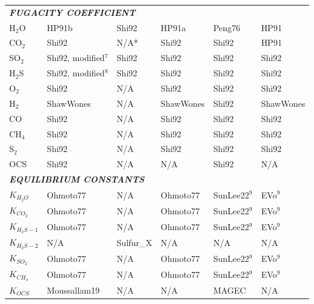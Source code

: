 \begin{landscape}
\begin{longtable}{p{1.4cm}p{3cm}p{3cm}p{3cm}p{3cm}p{3cm}}
\multicolumn{6}{p{17.8cm}}{\cellcolor[HTML]{D9D9D9}\textit{\textbf{FUGACITY COEFFICIENT}}} \\
H$_2$O &
  HP91b &
  Shi92 &
  HP91a &
  Peng76 &
  HP91 \\
CO$_2$ &
  Shi92 &
  N/A* &
  Shi92 &
  Shi92 &
  HP91 \\
SO$_2$ &
  Shi92, modified$^7$ &
  Shi92 &
  Shi92 &
  Shi92 &
  Shi92 \\
H$_2$S &
  Shi92, modified$^8$ &
  Shi92 &
  Shi92 &
  Shi92 &
  Shi92 \\
O$_2$ &
  Shi92 &
  N/A &
  Shi92 &
  Shi92 &
  Shi92 \\
H$_2$ &
  ShawWones &
  N/A &
  ShawWones &
  Shi92 &
  ShawWones \\
CO &
  Shi92 &
  N/A &
  Shi92 &
  Shi92 &
  Shi92 \\
CH$_4$ &
  Shi92 &
  N/A &
  Shi92 &
  Shi92 &
  Shi92 \\
S$_2$ &
  Shi92 &
  N/A &
  Shi92 &
  Shi92 &
  Shi92 \\
OCS &
  Shi92 &
  N/A &
  N/A &
  Shi92 &
  N/A \\

\multicolumn{6}{p{17.8cm}}{\cellcolor[HTML]{D9D9D9}\textit{\textbf{EQUILIBRIUM CONSTANTS}}} \\
$K_{H_2O}$ &
  Ohmoto77 &
  N/A &
  Ohmoto77 &
  SunLee22$^9$ &
  EVo$^9$ \\
$K_{CO_2}$ &
  Ohmoto77 &
  N/A &
  Ohmoto77 &
  SunLee22$^9$ &
  EVo$^9$ \\
$K_{H_2S-1}$ &
  Ohmoto77 &
  N/A &
  Ohmoto77 &
  SunLee22$^9$ &
  EVo$^9$ \\
$K_{H_2S-2}$ &
  N/A &
  Sulfur\_X &
  N/A &
  N/A &
  N/A \\
$K_{SO_2}$ &
  Ohmoto77 &
  N/A &
  Ohmoto77 &
  SunLee22$^9$ &
  EVo$^9$ \\
$K_{CH_4}$ &
  Ohmoto77 &
  N/A &
  Ohmoto77 &
  SunLee22$^9$ &
  EVo$^9$ \\
$K_{OCS}$ &
  Moussallam19 &
  N/A &
  N/A &
  MAGEC &
  N/A \\


\end{longtable}
\end{landscape}
